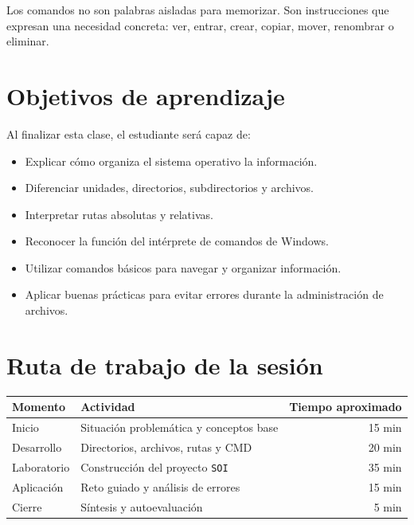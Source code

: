 \documentclass[
  spanish,
  letterpaper,
]{scrbook}
\newcounter{none} %
\providecommand{\tightlist}{%
  \setlength{\itemsep}{0pt}\setlength{\parskip}{0pt}}
\begin{document}
\begin{tcolorbox}[enhanced jigsaw, arc=.35mm, bottomrule=.15mm, bottomtitle=1mm, breakable, colback=white, colbacktitle=quarto-callout-note-color!10!white, colframe=quarto-callout-note-color-frame, coltitle=black, left=2mm, leftrule=.75mm, opacityback=0, opacitybacktitle=0.6, rightrule=.15mm, title=\textcolor{quarto-callout-note-color}{\faInfo}\hspace{0.5em}{Idea central}, titlerule=0mm, toprule=.15mm, toptitle=1mm]

Los comandos no son palabras aisladas para memorizar. Son instrucciones
que expresan una necesidad concreta: ver, entrar, crear, copiar, mover,
renombrar o eliminar.

\end{tcolorbox}

\section{Objetivos de aprendizaje}\label{objetivos-de-aprendizaje-1}

Al finalizar esta clase, el estudiante será capaz de:

\begin{itemize}
\tightlist
\item
  Explicar cómo organiza el sistema operativo la información.
\item
  Diferenciar unidades, directorios, subdirectorios y archivos.
\item
  Interpretar rutas absolutas y relativas.
\item
  Reconocer la función del intérprete de comandos de Windows.
\item
  Utilizar comandos básicos para navegar y organizar información.
\item
  Aplicar buenas prácticas para evitar errores durante la administración
  de archivos.
\end{itemize}

\section{Ruta de trabajo de la
sesión}\label{ruta-de-trabajo-de-la-sesiuxf3n}

{\def\LTcaptype{none} %
\begin{longtable}[]{@{}llr@{}}
\toprule\noalign{}
Momento & Actividad & Tiempo aproximado \\
\midrule\noalign{}
\endhead
\bottomrule\noalign{}
\endlastfoot
Inicio & Situación problemática y conceptos base & 15 min \\
Desarrollo & Directorios, archivos, rutas y CMD & 20 min \\
Laboratorio & Construcción del proyecto \texttt{SOI} & 35 min \\
Aplicación & Reto guiado y análisis de errores & 15 min \\
Cierre & Síntesis y autoevaluación & 5 min \\
\end{longtable}
}
\end{document}
